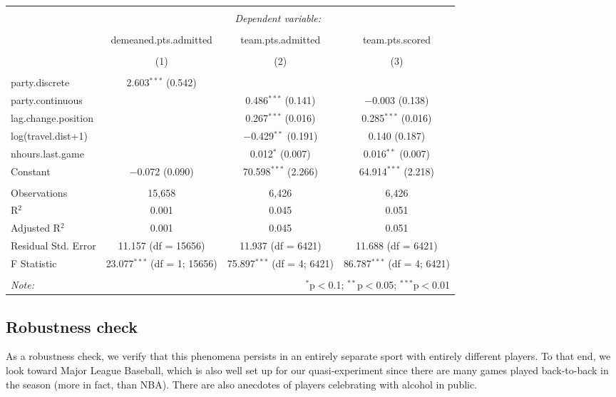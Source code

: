 \documentclass[letterpaper,12pt]{article}
\begin{document}
\hspace{-80pt}
\begin{tabular}{@{\extracolsep{5pt}}lccc}  \\[-1.8ex]\hline  \hline \\[-1.8ex]   & \multicolumn{3}{c}{\textit{Dependent variable:}} \\  \cline{2-4}  \\[-1.8ex] & demeaned.pts.admitted & team.pts.admitted & team.pts.scored \\  \\[-1.8ex] & (1) & (2) & (3)\\  \hline \\[-1.8ex]   party.discrete & 2.603$^{***}$ (0.542) &  &  \\    party.continuous &  & 0.486$^{***}$ (0.141) & $-$0.003 (0.138) \\    lag.change.position &  & 0.267$^{***}$ (0.016) & 0.285$^{***}$ (0.016) \\    log(travel.dist+1) &  & $-$0.429$^{**}$ (0.191) & 0.140 (0.187) \\    nhours.last.game &  & 0.012$^{*}$ (0.007) & 0.016$^{**}$ (0.007) \\    Constant & $-$0.072 (0.090) & 70.598$^{***}$ (2.266) & 64.914$^{***}$ (2.218) \\   \hline \\[-1.8ex]  Observations & 15,658 & 6,426 & 6,426 \\  R$^{2}$ & 0.001 & 0.045 & 0.051 \\  Adjusted R$^{2}$ & 0.001 & 0.045 & 0.051 \\  Residual Std. Error & 11.157 (df = 15656) & 11.937 (df = 6421) & 11.688 (df = 6421) \\  F Statistic & 23.077$^{***}$ (df = 1; 15656) & 75.897$^{***}$ (df = 4; 6421) & 86.787$^{***}$ (df = 4; 6421) \\  \hline  \hline \\[-1.8ex]  \textit{Note:}  & \multicolumn{3}{r}{$^{*}$p$<$0.1; $^{**}$p$<$0.05; $^{***}$p$<$0.01} \\  \end{tabular} 



\subsection{Robustness check}
As a robustness check, we verify that this phenomena persists in an entirely separate
sport with entirely different players. To that end, we look toward
Major League Baseball, which is also well set up for our quasi-experiment since
there are many games played back-to-back in the season (more in fact, than NBA).
There are also anecdotes of players celebrating with alcohol in public.\cite{miller,campbell}
\end{document}
